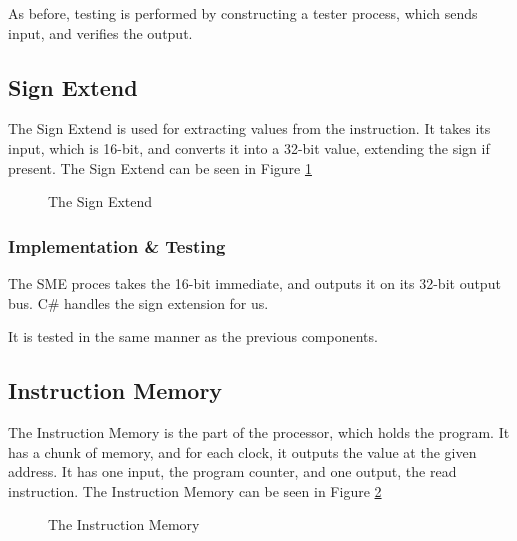 As before, testing is performed by constructing a tester process, which sends
input, and verifies the output.

\subsection{Sign Extend}
The Sign Extend is used for extracting values from the instruction. It takes
its input, which is 16-bit, and converts it into a 32-bit value, extending the
sign if present. The Sign Extend can be seen in Figure \ref{fig:sign}
\begin{figure}
    \centering
    \caption{The Sign Extend}
    \label{fig:sign}
\end{figure}

\subsubsection*{Implementation \& Testing}
The SME proces takes the 16-bit immediate, and outputs it on its 32-bit output
bus. C\# handles the sign extension for us.

It is tested in the same manner as the previous components.

\subsection{Instruction Memory}
The Instruction Memory is the part of the processor, which holds the program.
It has a chunk of memory, and for each clock, it outputs the value at the given
address. It has one input, the program counter, and one output, the read
instruction. The Instruction Memory can be seen in Figure \ref{fig:inst}
\begin{figure}
    \centering
    \caption{The Instruction Memory}
    \label{fig:inst}
\end{figure}

